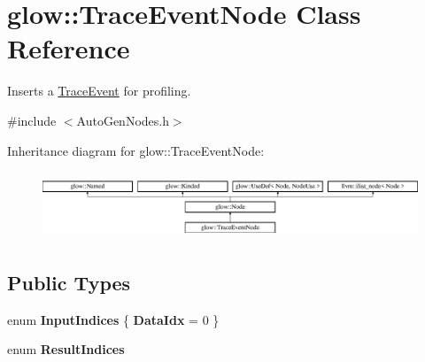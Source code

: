 \hypertarget{classglow_1_1_trace_event_node}{}\section{glow\+:\+:Trace\+Event\+Node Class Reference}
\label{classglow_1_1_trace_event_node}


Inserts a \hyperlink{structglow_1_1_trace_event}{Trace\+Event} for profiling.  




{\ttfamily \#include $<$Auto\+Gen\+Nodes.\+h$>$}

Inheritance diagram for glow\+:\+:Trace\+Event\+Node\+:\begin{figure}[H]
\begin{center}
\leavevmode
\includegraphics[height=2.028986cm]{classglow_1_1_trace_event_node}
\end{center}
\end{figure}
\subsection*{Public Types}
\begin{DoxyCompactItemize}
\item 
\mbox{\label{classglow_1_1_trace_event_node_a6fc0a8a93acac700704fd967f0de206c}} 
enum {\bfseries Input\+Indices} \{ {\bfseries Data\+Idx} = 0
 \}
\item 
\mbox{\label{classglow_1_1_trace_event_node_aa4676e556c26cbb106f0c0eac678ed24}} 
enum {\bfseries Result\+Indices} 
\end{DoxyCompactItemize}
